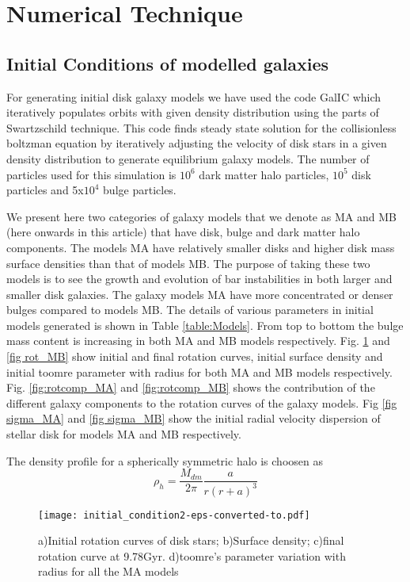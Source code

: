 \documentclass[a4paper,fleqn,usenatbib,useAMS]{mnras}
\begin{document}
\section{Numerical Technique}\label{Technique}
\subsection{Initial Conditions of modelled galaxies} 
For generating initial disk galaxy models we have used the code GalIC \citep{55} which iteratively populates orbits with given density distribution using the parts of Swartzschild technique. This code finds steady state solution for the collisionless boltzman equation by iteratively adjusting the  velocity of disk stars in a given density distribution to generate equilibrium galaxy models. The number of particles used for this simulation is $10^6$ dark matter halo particles, $10^5$ disk particles and 5x$10^4$ bulge particles. 

We present here two categories of galaxy models that we denote as MA and MB (here onwards in this article) that have disk, bulge and dark matter halo components. The models MA have relatively smaller disks and higher disk mass surface densities than that of models MB. The purpose of taking these two models is to see the growth and evolution of bar instabilities in both larger and smaller disk galaxies. The galaxy models MA have more concentrated or denser bulges compared to models MB. The details of various parameters in initial models generated is shown in Table \ref{table:Models}. From top to bottom the bulge mass content is increasing in both MA and MB models respectively. Fig. \ref{fig rot_MA} and \ref{fig rot_MB} show initial and final rotation curves, initial surface density and initial toomre parameter with radius for both MA and MB models respectively. Fig. \ref{fig:rotcomp_MA} and \ref{fig:rotcomp_MB} shows the contribution of the different galaxy components to the rotation curves of the galaxy models. Fig \ref{fig sigma_MA} and \ref{fig sigma_MB} show the initial radial velocity dispersion of stellar disk for models MA and MB respectively.

The density profile for a spherically symmetric halo is choosen as
\begin{equation}
\rho_h=\dfrac{M_{dm}}{2 \pi} \dfrac{a}{r(r+a)^3}
\end{equation}   

\begin{figure}
\texttt{[image: initial\_condition2-eps-converted-to.pdf]}
\caption{a)Initial rotation curves of disk stars; b)Surface density; c)final rotation curve at 9.78Gyr. d)toomre's parameter variation with radius for all the MA models}
\label{fig rot_MA}
\end{figure}
\end{document}
